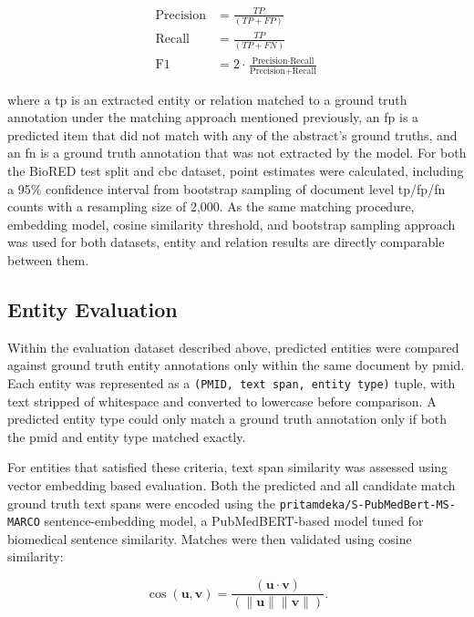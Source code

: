\[
\begin{aligned}
\text{Precision} &= \frac{TP}{(TP + FP)}
\\
\text{Recall} &= \frac{TP}{(TP + FN)}
\\
\text{F1} &= 2 \cdot \frac{\text{Precision} \cdot \text{Recall}}{\text{Precision} + \text{Recall}}
\end{aligned}
\]

\vspace{1em}

\noindent where a \gls{tp} is an extracted entity or relation matched to a ground truth annotation under the matching approach mentioned previously, an \gls{fp} is a predicted item that did not match with any of the abstract's ground truths, and an \gls{fn} is a ground truth annotation that was not extracted by the model. For both the BioRED test split and \gls{cbc} dataset, point estimates were calculated, including a 95\% confidence interval from bootstrap sampling of document level \gls{tp}/\gls{fp}/\gls{fn} counts with a resampling size of 2,000. As the same matching procedure, embedding model, cosine similarity threshold, and bootstrap sampling approach was used for both datasets, entity and relation results are directly comparable between them.

\subsection{Entity Evaluation}
\label{subsec:meth:entity_evaluation}
Within the evaluation dataset described above, predicted entities were compared against ground truth entity annotations only within the same document by \gls{pmid}. Each entity was represented as a \texttt{(PMID, text span, entity type)} tuple, with text stripped of whitespace and converted to lowercase before comparison. A predicted entity type could only match a ground truth annotation only if both the \gls{pmid} and entity type matched exactly.

For entities that satisfied these criteria, text span similarity was assessed using vector embedding based evaluation. Both the predicted and all candidate match ground truth text spans were encoded using the \texttt{pritamdeka/S-PubMedBert-MS-MARCO} sentence-embedding model, a PubMedBERT-based model tuned for biomedical sentence similarity. Matches were then validated using cosine similarity:

\[
\cos(\mathbf{u}, \mathbf{v})
=
\frac{(\mathbf{u} \cdot \mathbf{v})}
{(\lVert \mathbf{u} \rVert \lVert \mathbf{v} \rVert)}.
\]

